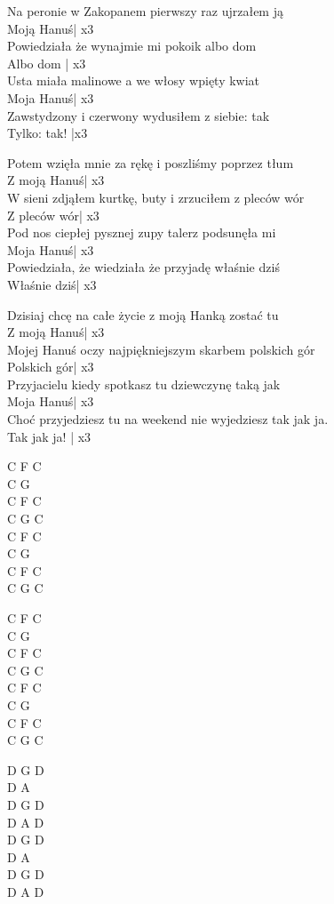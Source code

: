\begin{text}

    Na peronie w Zakopanem pierwszy raz ujrzałem ją\\
    Moją Hanuś| x3\\
    Powiedziała że wynajmie mi pokoik albo dom\\
    Albo dom | x3\\
    Usta miała malinowe a we włosy wpięty kwiat\\
    Moja Hanuś| x3\\
    Zawstydzony i czerwony wydusiłem z siebie: tak\\
    Tylko: tak! |x3

    Potem wzięła mnie za rękę i poszliśmy poprzez tłum\\
    Z moją Hanuś| x3\\
    W sieni zdjąłem kurtkę, buty i zrzuciłem z pleców wór\\
    Z pleców wór| x3\\
    Pod nos ciepłej pysznej zupy talerz podsunęła mi\\
    Moja Hanuś| x3\\
    Powiedziała, że wiedziała że przyjadę właśnie dziś\\
    Właśnie dziś| x3

    Dzisiaj chcę na całe życie z moją Hanką zostać tu\\
    Z moją Hanuś| x3\\
    Mojej Hanuś oczy najpiękniejszym skarbem polskich gór\\
    Polskich gór| x3\\
    Przyjacielu kiedy spotkasz tu dziewczynę taką jak\\
    Moja Hanuś| x3\\
    Choć przyjedziesz tu na weekend nie wyjedziesz tak jak ja.\\
    Tak jak ja! | x3

\end{text}
\begin{chord}
    C F C\\
    C G\\
    C F C\\
    C G C\\
    C F C\\
    C G\\
    C F C\\
    C G C

    C F C\\
    C G\\
    C F C\\
    C G C\\
    C F C\\
    C G\\
    C F C\\
    C G C

    D G D\\
    D A\\
    D G D\\
    D A D\\
    D G D\\
    D A\\
    D G D\\
    D A D


\end{chord}